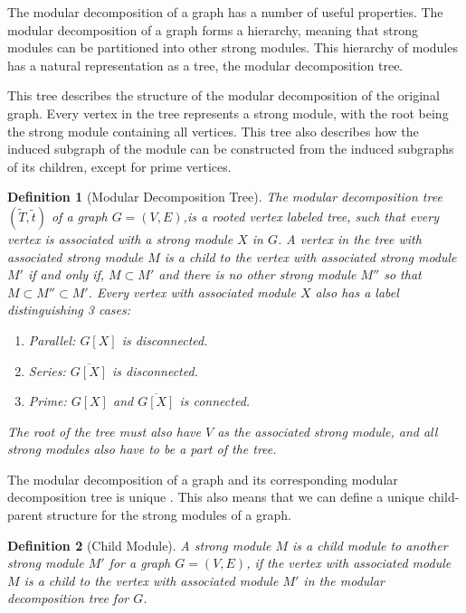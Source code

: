 \documentclass[a4paper]{article}
\newtheorem{definition}{Definition}[section]
\newcommand{\T}{\widetilde{T}}
\renewcommand{\t}{\widetilde{t}}
\begin{document}
The modular decomposition of a graph has a number of useful properties. The
modular decomposition of a graph forms a hierarchy, meaning that strong modules
can be partitioned into other strong modules. This hierarchy of modules has a
natural representation as a tree, the modular decomposition tree.

This tree describes the structure of the modular decomposition of the original
graph. Every vertex in the tree represents a strong module, with the root being
the strong module containing all vertices. This tree also describes how the
induced subgraph of the module can be constructed from the induced subgraphs of
its children, except for prime vertices.

\begin{definition}[Modular Decomposition Tree]{\cite{MDTree}}
    The modular decomposition tree $(\T,\t)$ of a graph $G = (V,E)$,is a rooted
    vertex labeled tree, such that every vertex is associated with a strong
    module $X$ in $G$.  A vertex in the tree with associated strong module $M$
    is a child to the vertex with associated strong module $M'$ if and only if,
    $M \subset M'$ and there is no other strong module $M''$ so that $M \subset
    M'' \subset M'$. Every vertex with associated module $X$ also has a label
    distinguishing 3 cases:
    \begin{enumerate}
        \item Parallel: $G[X]$ is disconnected.
        \item Series: $\overline{G[X]}$ is disconnected.
        \item Prime: $G[X]$ and $\overline{G[X]}$ is connected.
    \end{enumerate}
    The root of the tree must also have $V$ as the associated strong module, and all 
    strong modules also have to be a part of the tree.
\end{definition}
The modular decomposition of a graph and its corresponding modular
decomposition tree is unique \cite{MDUnique}. This also means that we can 
define a unique child-parent structure for the strong modules of a graph.

\begin{definition}[Child Module]
    A strong module $M$ is a child module to another strong module $M'$ for a
    graph $G = (V,E)$, if the vertex with associated module $M$ is a child to
    the vertex with associated module $M'$ in the modular decomposition tree for
    $G$.
\end{definition}
\end{document}
